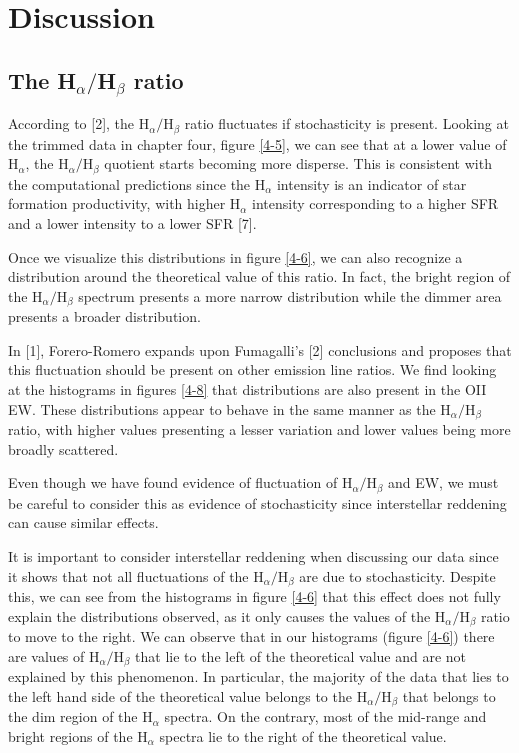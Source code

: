 
\chapter{Discussion}

\section{The H$_{\alpha}/$H$_{\beta}$ ratio}

According to [2], the H$_{\alpha}/$H$_{\beta}$ ratio fluctuates if stochasticity is present. Looking at the trimmed data in chapter
four, figure \ref{4-5}, we can see that at a lower value of H$_{\alpha}$, the H$_{\alpha}/$H$_{\beta}$ quotient starts becoming more disperse. This
is consistent with the computational predictions since the H$_{\alpha}$ intensity is an indicator of star formation
productivity, with higher H$_{\alpha}$ intensity corresponding to a higher SFR and a lower intensity to a lower SFR [7].

Once we visualize this distributions in figure \ref{4-6}, we can also recognize a distribution around the theoretical value of this
ratio. In fact, the bright region of the H$_{\alpha}/$H$_{\beta}$ spectrum presents a more narrow distribution while the dimmer
area presents a broader distribution.

In [1], Forero-Romero expands upon Fumagalli's [2] conclusions and proposes that this fluctuation should be present on other
emission line ratios. We find looking at the histograms in figures \ref{4-8} that distributions are also present in the OII EW.
These distributions appear to behave in the same manner as the H$_{\alpha}/$H$_{\beta}$ ratio, with higher values presenting a
lesser variation and lower values being more broadly scattered.

Even though we have found evidence of fluctuation of H$_{\alpha}/$H$_{\beta}$ and EW, we must be careful to consider this as
evidence of stochasticity since interstellar reddening can cause similar effects.

It is important to consider interstellar reddening when discussing our data since it shows that not all fluctuations of the
H$_{\alpha}/$H$_{\beta}$ are due to stochasticity. Despite this, we can see from the histograms in figure \ref{4-6} that this effect
does not fully explain the distributions observed, as it only causes the values of the H$_{\alpha}/$H$_{\beta}$ ratio to move to
the right. We can observe that in our histograms (figure \ref{4-6}) there are values of H$_{\alpha}/$H$_{\beta}$ that lie to the
left of the theoretical value and are not explained by this phenomenon. In particular, the majority of the data that lies to the
left hand side of the theoretical value belongs to the H$_{\alpha}/$H$_{\beta}$ that belongs to the dim region of the H$_{\alpha}$
spectra. On the contrary, most of the mid-range and bright regions of the H$_{\alpha}$ spectra lie to the right of the theoretical
value.

